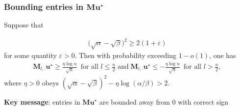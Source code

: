 \documentclass[compress,
mathserif,wide,%
]{beamer}
\begin{document}
\begin{frame}
	\frametitle{Bounding entries in $\bm{M}\bm{u}^{\star}$}	
\begin{lemma}
	\label{lemma:M-ustar-lower-bound-CD}
	Suppose that
	
	\vspace{-2em}
\begin{align*}
	\big( \sqrt{\alpha} -\sqrt{\beta}\big)^2 \geq 2 \left ( 1+ \varepsilon  \right)  
\end{align*}
% 
for some quantity $\varepsilon>0$.   
Then with probability exceeding $1- o(1)$, one has
%
\begin{align*}
	 \bm{M}_{l,\cdot}\bm{u}^{\star}   \geq \frac{\eta \log n}{\sqrt{n}} \,\,\,\text{for all }l\leq \frac{n}{2}
	\;\text{and}\;
	   \bm{M}_{l,\cdot} \bm{u}^{\star}  
	\leq - \frac{\eta \log n}{\sqrt{n}} \,\,\, \text{for all } l > \frac{n}{2}, 
\end{align*}
where $\eta > 0$ obeys $(\sqrt{\alpha} - \sqrt{\beta})^2 - \eta \log (\alpha/\beta) > 2.$
%
\end{lemma}

\vfill
{\bf Key message}: entries in $\bm{M}\bm{u}^{\star}$ are bounded away from $0$ with correct sign
\end{frame}



%
%
\end{document}
